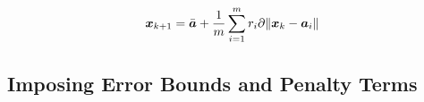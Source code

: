 \begin{equation} %
\Bx_{k+1} = \bar{\Ba} + \frac{1}{m} \sum^m_{i=1} r_i \partial \|\Bx_k - \Ba_i\|
\end{equation}
%
%
%	
\subsection{Imposing Error Bounds and Penalty Terms }

